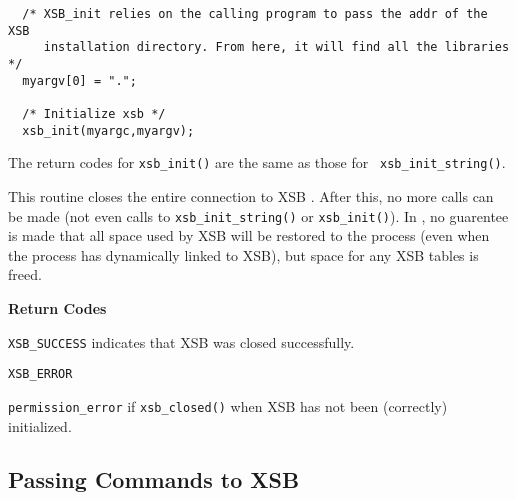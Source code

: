 \begin{description}
\begin{itemize}
\begin{verbatim}
  /* XSB_init relies on the calling program to pass the addr of the XSB
     installation directory. From here, it will find all the libraries */
  myargv[0] = ".";

  /* Initialize xsb */
  xsb_init(myargc,myargv);
    \end{verbatim}
\end{itemize}
The return codes for {\tt xsb\_init()} are the same as those for {\tt
  xsb\_init\_string()}.

 
%
This routine closes the entire connection to XSB .  After this, no
more calls can be made (not even calls to {\tt xsb\_init\_string()} or
{\tt xsb\_init()}).  In \version{}, no guarentee is made that all
space used by XSB will be restored to the process (even when the
process has dynamically linked to XSB), but space for any XSB tables
is freed.

{\bf Return Codes} 
\bi
\item {\tt XSB\_SUCCESS} indicates that XSB was closed successfully.
%
\item {\tt XSB\_ERROR} 
\bi
\item {\tt permission\_error} if {\tt xsb\_closed()} when XSB has not been
(correctly) initialized.  
\ei
%
\ei

\end{description}

\subsection{Passing Commands to XSB}

